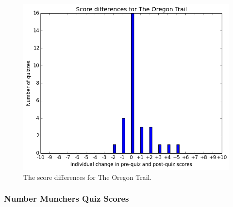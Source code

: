 			\begin{figure}[h] 
			\centering 
			\includegraphics[width=\textwidth]{oregon_results.png} 
			\caption{The score differences for The Oregon Trail.}
			\end{figure}

	\cleardoublepage

		\subsubsection{Number Munchers Quiz Scores}

			

